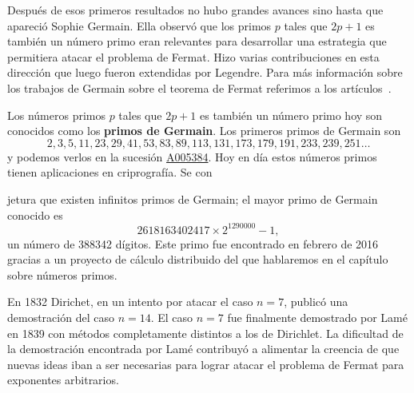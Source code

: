 
Después de esos primeros resultados no hubo grandes avances sino hasta que
apareció Sophie Germain. Ella observó que los primos $p$ tales que $2p+1$ es
también un número primo eran relevantes para desarrollar una estrategia que
permitiera atacar el problema de Fermat.  Hizo varias contribuciones en esta
dirección que luego fueron extendidas por Legendre. Para más información sobre
los trabajos de Germain sobre el teorema de Fermat referimos a los
artículos~\cite{MR2415091,MR2735899}.

Los números primos $p$ tales que $2p+1$ es también un número primo hoy son
conocidos como los \textbf{primos de Germain}. Los primeros primos de Germain
son
\[
	2, 3, 5, 11, 23, 29, 41, 53, 83, 89, 113, 131, 173, 179, 191, 233, 239,
	251\dots
\]
y podemos verlos en la sucesión 
\href{https://oeis.org/A005384}{A005384}.
Hoy en día estos números primos
tienen aplicaciones en criprografía. Se con

jetura que existen infinitos primos
de Germain; el mayor primo de Germain conocido es 
\[
	2618163402417\times 2^{1290000} - 1,
\]
un número de 388342 dígitos. Este primo fue encontrado en febrero de 2016
gracias a un proyecto de cálculo distribuido del que hablaremos en el capítulo
sobre números primos. 

En 1832 Dirichet, en un intento por atacar el caso $n=7$, publicó una
demostración del caso $n=14$. El caso $n=7$ fue finalmente demostrado por Lamé
en 1839 con métodos completamente distintos a los de Dirichlet. La dificultad
de la demostración encontrada por Lamé contribuyó a alimentar la creencia de
que nuevas ideas iban a ser necesarias para lograr atacar el problema de Fermat
para exponentes arbitrarios. 

